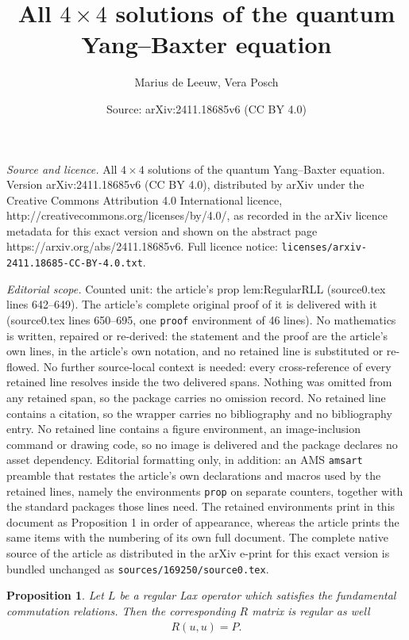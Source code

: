 \documentclass[10pt,a4paper]{amsart}
\title{All $4\times4$ solutions of the quantum Yang--Baxter equation}
\author{Marius de Leeuw, Vera Posch}
\date{Source: arXiv:2411.18685v6 (CC BY 4.0)}
\newtheorem{prop}{Proposition}
\begin{document}
\maketitle

\noindent\emph{Source and licence.} All $4\times4$ solutions of the quantum Yang--Baxter equation. Version arXiv:2411.18685v6 (CC BY 4.0), distributed by arXiv under the Creative Commons Attribution 4.0 International licence, http://creativecommons.org/licenses/by/4.0/, as recorded in the arXiv licence metadata for this exact version and shown on the abstract page https://arxiv.org/abs/2411.18685v6. Full licence notice: \texttt{licenses/arxiv-2411.18685-CC-BY-4.0.txt}.\par\smallskip

\noindent\textit{Editorial scope.} Counted unit: the article's prop lem:RegularRLL (source0.tex lines 642--649). The article's complete original proof of it is delivered with it (source0.tex lines 650--695, one \texttt{proof} environment of 46 lines). No mathematics is written, repaired or re-derived: the statement and the proof are the article's own lines, in the article's own notation, and no retained line is substituted or re-flowed.  No further source-local context is needed: every cross-reference of every retained line resolves inside the two delivered spans.  Nothing was omitted from any retained span, so the package carries no omission record.  No retained line contains a citation, so the wrapper carries no bibliography and no bibliography entry.  No retained line contains a figure environment, an image-inclusion command or drawing code, so no image is delivered and the package declares no asset dependency.  Editorial formatting only, in addition: an AMS \texttt{amsart} preamble that restates the article's own declarations and macros used by the retained lines, namely the environments \texttt{prop} on separate counters, together with the standard packages those lines need.  The retained environments print in this document as Proposition 1 in order of appearance, whereas the article prints the same items with the numbering of its own full document.  The complete native source of the article as distributed in the arXiv e-print for this exact version is bundled unchanged as \texttt{sources/169250/source0.tex}.
\begin{prop}\label{lem:RegularRLL}
Let $L$ be a regular Lax operator which satisfies the fundamental commutation relations. Then the corresponding $R$ matrix is regular as well
%
\begin{align}
R(u,u) = P.
\end{align}
% 
\end{prop}
\end{document}
